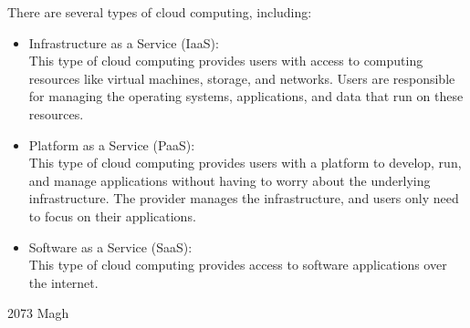 \documentclass[12pt]{article}
\begin{document}
\begin{enumerate}
    There are several types of cloud computing, including:
    \begin{itemize}
        \item Infrastructure as a Service (IaaS):\\ This type of cloud computing provides users with access to computing resources like virtual machines, storage, and networks. Users are responsible for managing the operating systems, applications, and data that run on these resources.
        \item Platform as a Service (PaaS):\\ This type of cloud computing provides users with a platform to develop, run, and manage applications without having to worry about the underlying infrastructure. The provider manages the infrastructure, and users only need to focus on their applications.
        \item Software as a Service (SaaS):\\ This type of cloud computing provides access to software applications over the internet.
    \end{itemize}
\end{enumerate}
\pagebreak
{\Large 2073 Magh}
\end{document}
